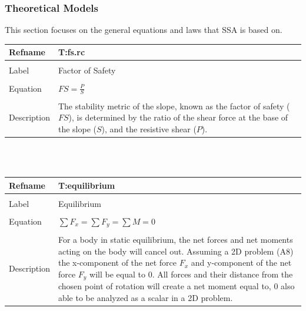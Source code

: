 \documentclass[12pt]{article}
\begin{document}
\subsubsection{Theoretical Models}
\label{Sec:TMs}
This section focuses on the general equations and laws that SSA is based on.
~\newline
\noindent \begin{minipage}{\textwidth}
\begin{tabular}{p{} p{}}
\toprule \textbf{Refname} & \textbf{T:fs.rc}
\label{T:fs.rc}
\\ \midrule \\
Label & Factor of Safety
\\ \midrule \\
Equation & $FS=\frac{P}{S}$
\\ \midrule \\
Description & The stability metric of the slope, known as the factor of safety ($FS$), is determined by the ratio of the shear force at the base of the slope ($S$), and the resistive shear ($P$).
\\ \bottomrule \end{tabular}
\end{minipage}\\
~\newline
\noindent \begin{minipage}{\textwidth}
\begin{tabular}{p{} p{}}
\toprule \textbf{Refname} & \textbf{T:equilibrium}
\label{T:equilibrium}
\\ \midrule \\
Label & Equilibrium
\\ \midrule \\
Equation & $\displaystyle\sum{{F_{x}}}=\displaystyle\sum{{F_{y}}}=\displaystyle\sum{M}=0$
\\ \midrule \\
Description & For a body in static equilibrium, the net forces and net moments acting on the body will cancel out. Assuming a 2D problem (A8) the x-component of the net force ${F_{x}}$ and y-component of the net force ${F_{y}}$ will be equal to $0$. All forces and their distance from the chosen point of rotation will create a net moment equal to, $0$ also able to be analyzed as a scalar in a 2D problem.
\\ \bottomrule \end{tabular}
\end{minipage}\\
\end{document}

